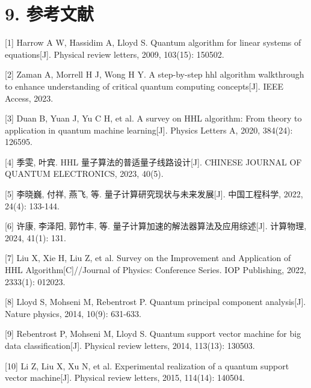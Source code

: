 \documentclass[aps,prl,twocolumn,groupedaddress]{revtex4-2}
\begin{document}



\section{9. 参考文献}

[1] Harrow A W, Hassidim A, Lloyd S. Quantum algorithm for linear systems of equations[J]. Physical review letters, 2009, 103(15): 150502.

[2] Zaman A, Morrell H J, Wong H Y. A step-by-step hhl algorithm walkthrough to enhance understanding of critical quantum computing concepts[J]. IEEE Access, 2023.

[3] Duan B, Yuan J, Yu C H, et al. A survey on HHL algorithm: From theory to application in quantum machine learning[J]. Physics Letters A, 2020, 384(24): 126595.

[4] 季雯, 叶宾. HHL 量子算法的普适量子线路设计[J]. CHINESE JOURNAL OF QUANTUM ELECTRONICS, 2023, 40(5).

[5] 李晓巍, 付祥, 燕飞, 等. 量子计算研究现状与未来发展[J]. 中国工程科学, 2022, 24(4): 133-144.

[6] 许康, 李泽阳, 郭竹丰, 等. 量子计算加速的解法器算法及应用综述[J]. 计算物理, 2024, 41(1): 131.

[7] Liu X, Xie H, Liu Z, et al. Survey on the Improvement and Application of HHL Algorithm[C]//Journal of Physics: Conference Series. IOP Publishing, 2022, 2333(1): 012023.

[8] Lloyd S, Mohseni M, Rebentrost P. Quantum principal component analysis[J]. Nature physics, 2014, 10(9): 631-633.

[9] Rebentrost P, Mohseni M, Lloyd S. Quantum support vector machine for big data classification[J]. Physical review letters, 2014, 113(13): 130503.

[10] Li Z, Liu X, Xu N, et al. Experimental realization of a quantum support vector machine[J]. Physical review letters, 2015, 114(14): 140504.
\end{document}
